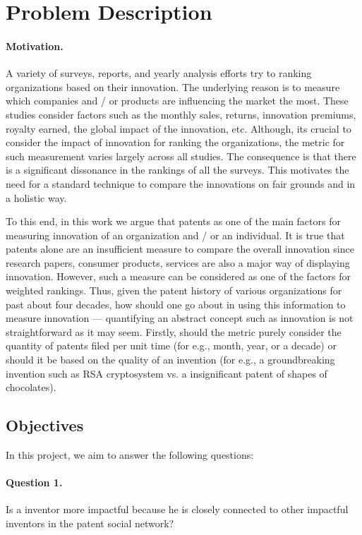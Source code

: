 \section{Problem Description}

\paragraph{Motivation.}

A variety of surveys, reports, and yearly analysis efforts try to ranking
organizations  based on their innovation. The underlying reason is to measure
which companies and / or products are influencing the market the most.  These
studies consider factors such as the monthly sales, returns, innovation
premiums, royalty earned, the global impact of the innovation, etc. Although,
its crucial to  consider the impact of innovation for ranking the
organizations, the metric for such measurement  varies largely across all
studies. The consequence is that there is a significant dissonance in the
rankings of all the surveys.  This motivates the need for a standard technique
to compare the innovations on fair grounds and in a holistic way. 

To this end, in this work we argue that patents as one of the main factors for
measuring innovation of an organization and / or an individual. It is true
that patents alone are an insufficient measure to compare the overall
innovation since research papers, consumer products, services are also a major
way of displaying innovation. However, such a measure can be considered as one
of the factors for weighted rankings. Thus, given the patent history of
various organizations for past about four decades,  how should one go about in
using this information to measure innovation --- quantifying an abstract
concept such as innovation is not straightforward as it may seem. Firstly,
should the metric purely consider the quantity of patents filed per unit time
(for e.g., month, year, or a decade) or should it be based on the quality of
an invention (for e.g., a groundbreaking invention such as RSA cryptosystem
vs. a insignificant patent of shapes of chocolates).

\subsection{Objectives}
 
In this project, we aim to answer the following questions:

\paragraph{Question 1.} Is a inventor more impactful because he is closely
connected to other impactful inventors in the patent social network? 

